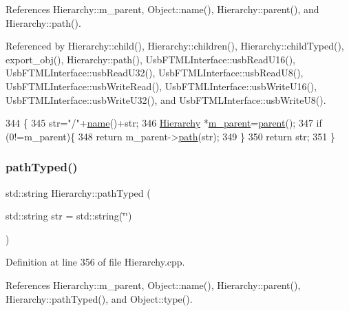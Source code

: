 References Hierarchy\+::m\+\_\+parent, Object\+::name(), Hierarchy\+::parent(), and Hierarchy\+::path().



Referenced by Hierarchy\+::child(), Hierarchy\+::children(), Hierarchy\+::child\+Typed(), export\+\_\+obj(), Hierarchy\+::path(), Usb\+F\+T\+M\+L\+Interface\+::usb\+Read\+U16(), Usb\+F\+T\+M\+L\+Interface\+::usb\+Read\+U32(), Usb\+F\+T\+M\+L\+Interface\+::usb\+Read\+U8(), Usb\+F\+T\+M\+L\+Interface\+::usb\+Write\+Read(), Usb\+F\+T\+M\+L\+Interface\+::usb\+Write\+U16(), Usb\+F\+T\+M\+L\+Interface\+::usb\+Write\+U32(), and Usb\+F\+T\+M\+L\+Interface\+::usb\+Write\+U8().


\begin{DoxyCode}
344                                       \{
345   str=\textcolor{stringliteral}{"/"}+\hyperlink{classObject_a300f4c05dd468c7bb8b3c968868443c1}{name}()+str;
346   \hyperlink{classHierarchy}{Hierarchy} *\hyperlink{classHierarchy_a5814bb280d4e8539ab25ab6cbfb9cc4f}{m\_parent}=\hyperlink{classHierarchy_a1c7bec8257e717f9c1465e06ebf845fc}{parent}();
347   \textcolor{keywordflow}{if} (0!=m\_parent)\{
348     \textcolor{keywordflow}{return} m\_parent->\hyperlink{classHierarchy_aa7990fa7caf132d83e361ce033c6c65a}{path}(str);
349   \}
350   \textcolor{keywordflow}{return} str;
351 \}
\end{DoxyCode}
\mbox{\label{classHierarchy_a1efd56cd164d328d2002e53a10a19b8c}} 
\subsubsection{\texorpdfstring{path\+Typed()}{pathTyped()}}
{\footnotesize\ttfamily std\+::string Hierarchy\+::path\+Typed (\begin{DoxyParamCaption}\item[{std\+::string}]{str = {\ttfamily std\+:\+:string(\char`\"{}\char`\"{})} }\end{DoxyParamCaption})\hspace{0.3cm}{\ttfamily [inherited]}}



Definition at line 356 of file Hierarchy.\+cpp.



References Hierarchy\+::m\+\_\+parent, Object\+::name(), Hierarchy\+::parent(), Hierarchy\+::path\+Typed(), and Object\+::type().



